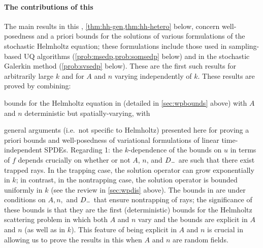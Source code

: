 \paragraph{The contributions of this } The main results in this , \cref{thm:hh-gen,thm:hh-hetero} below, concern well-posedness and a priori bounds for the solutions of various formulations of the stochastic Helmholtz equation; these formulations include those used in sampling-based UQ algorithms (\cref{prob:msedp,prob:somsedp} below) and in the stochastic Galerkin method (\cref{prob:svsedp} below). These are the first such results for arbitrarily large $k$ and for $A$ and $n$ varying independently of $k$. These results are proved by combining:
\ben
\item bounds for the Helmholtz equation in \cite{GrPeSp:19} (detailed in \cref{sec:wpbounds} above) with $A$ and $n$ deterministic but spatially-varying, with
\item general arguments (i.e.~not specific to Helmholtz) presented here for proving a priori bounds and well-posedness of variational formulations of linear time-independent SPDEs.
\een
Regarding 1: the $k$-dependence of the bounds on $u$ in terms of $f$ depends crucially on whether or not $A$, $n$, and $D_{-}$ are such that there exist trapped rays. In the trapping case, the solution operator can grow exponentially in $k$; in contrast, in the nontrapping case, the solution operator is bounded uniformly in $k$ (see the review in \cref{sec:wpdis} above). The bounds in \cite{GrPeSp:19} are under conditions on $A,n,$ and $D_{-}$ that ensure nontrapping of rays; the significance of these bounds is that they are the first (deterministic) bounds for the Helmholtz scattering problem in which both $A$ and $n$ vary and the bounds are explicit in $A$ and $n$ (as well as in $k$). This feature of being explicit in $A$ and $n$ is crucial in allowing us to prove the results in this  when $A$ and $n$ are random fields.

